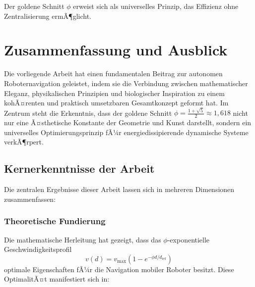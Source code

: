 ﻿\documentclass[a4paper,12pt]{article}
\theoremstyle{definition}
\begin{document}
Der goldene Schnitt $\phi$ erweist sich als universelles Prinzip, das Effizienz ohne Zentralisierung ermÃ¶glicht.

\section{Zusammenfassung und Ausblick}

Die vorliegende Arbeit hat einen fundamentalen Beitrag zur autonomen Roboternavigation geleistet, indem sie die Verbindung zwischen mathematischer Eleganz, physikalischen Prinzipien und biologischer Inspiration zu einem kohÃ¤renten und praktisch umsetzbaren Gesamtkonzept geformt hat. Im Zentrum steht die Erkenntnis, dass der goldene Schnitt $\phi = \frac{1+\sqrt{5}}{2} \approx 1{,}618$ nicht nur eine Ã¤sthetische Konstante der Geometrie und Kunst darstellt, sondern ein universelles Optimierungsprinzip fÃ¼r energiedissipierende dynamische Systeme verkÃ¶rpert.

\subsection{Kernerkenntnisse der Arbeit}

Die zentralen Ergebnisse dieser Arbeit lassen sich in mehreren Dimensionen zusammenfassen:

\subsubsection{Theoretische Fundierung}

Die mathematische Herleitung hat gezeigt, dass das $\phi$-exponentielle Geschwindigkeitsprofil
\begin{equation}
	v(d) = v_{\max}\left(1 - e^{-\phi d/d_{\text{ref}}}\right)
\end{equation}
optimale Eigenschaften fÃ¼r die Navigation mobiler Roboter besitzt. Diese OptimalitÃ¤t manifestiert sich in:
\end{document}
